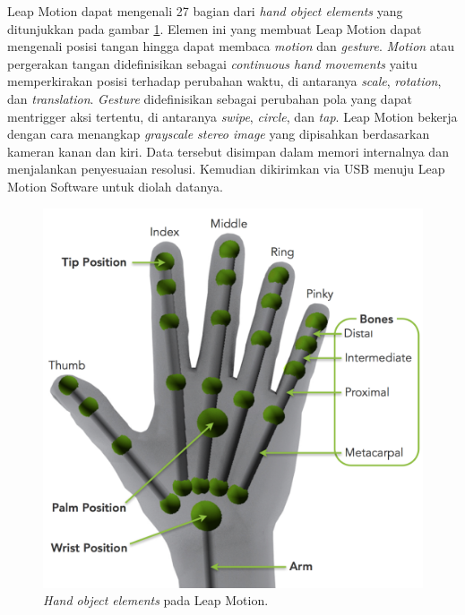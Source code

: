	Leap Motion dapat mengenali 27 bagian dari \textit{hand object elements} yang ditunjukkan pada gambar \ref{fig:handobject}. Elemen ini yang membuat Leap Motion dapat mengenali posisi tangan hingga dapat membaca \textit{motion} dan \textit{gesture}. \textit{Motion} atau pergerakan tangan didefinisikan sebagai \textit{continuous hand movements} yaitu memperkirakan posisi terhadap perubahan waktu, di antaranya \textit{scale}, \textit{rotation}, dan \textit{translation}. \textit{Gesture} didefinisikan sebagai perubahan pola yang dapat mentrigger aksi tertentu, di antaranya \textit{swipe}, \textit{circle}, dan \textit{tap}. Leap Motion bekerja dengan cara menangkap \textit{grayscale stereo image} yang dipisahkan berdasarkan kameran kanan dan kiri. Data tersebut disimpan dalam memori internalnya dan menjalankan penyesuaian resolusi. Kemudian dikirimkan via USB menuju Leap Motion Software untuk diolah datanya.
	\begin{figure} [H]
		\includegraphics[scale=0.25]{img/bab2/handobject.png}
		\caption{\textit{Hand object elements} pada Leap Motion.}
		\label{fig:handobject}
	\end{figure}
\vspace{2ex}
